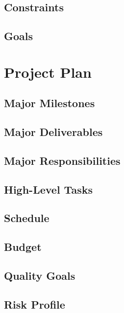 \documentclass[10pt,letterpaper]{article}
\begin{document}
\subsection{Constraints}


\subsection{Goals}


\section{Project Plan}


\subsection{Major Milestones}


\subsection{Major Deliverables}


\subsection{Major Responsibilities}


\subsection{High-Level Tasks}


\subsection{Schedule}


\subsection{Budget}


\subsection{Quality Goals}


\subsection{Risk Profile}

\end{document}
